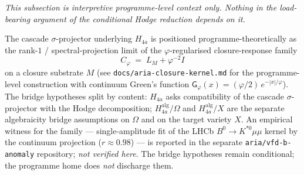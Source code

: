 \documentclass[11pt, a4paper]{amsart}
\theoremstyle{definition}
\begin{document}
\emph{This subsection is interpretive programme-level context only.
Nothing in the load-bearing argument of the conditional Hodge
reduction depends on it.}\medskip

The cascade $\sigma$-projector underlying $H_{4a}$ is positioned
programme-theoretically as the rank-$1$ / spectral-projection
limit of the $\varphi$-regularised closure-response family
\[
C_\varphi \;=\; L_M + \varphi^{-2} I
\]
on a closure substrate $M$ (see
\texttt{docs/aria-closure-kernel.md} for the programme-level
construction with continuum Green's function
$\mathsf G_\varphi(x) = (\varphi/2)\,e^{-|x|/\varphi}$).  The
bridge hypotheses split by content:
$H_{4a}$ asks compatibility of the cascade $\sigma$-projector with
the Hodge decomposition; $H_{4a}^{\mathrm{alg}}/\Omega$ and
$H_{4a}^{\mathrm{alg}}/X$ are the separate algebraicity bridge
assumptions on $\Omega$ and on the target variety $X$.  An
empirical witness for the family --- single-amplitude fit of the
LHCb $B^0\to K^{*0}\mu\mu$ kernel by the continuum projection
($r \approx 0.98$) --- is reported in the separate
\texttt{aria/vfd-b-anomaly} repository; \emph{not verified here}.
The bridge hypotheses remain conditional; the programme home does
\emph{not} discharge them.
\end{document}
